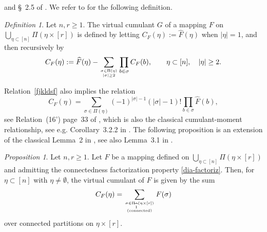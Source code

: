 \documentclass[bj,authoryear,noshowframe]{imsart}
\theoremstyle{plain}
\theoremstyle{remark}
\newtheorem{definition}[theorem]{Definition}
\newcommand{\E}{\mathbb{E}}
\newtheorem{prop}{Proposition}[section]
\begin{document}
 and \S~2.5 of \cite{peccatitaqqu}. 
 We refer to \cite[p.~33]{MalyshevMinlos91} for the following definition.
\begin{definition}
  Let $n,r\geq 1$.
  The virtual cumulant $G$ of 
 a mapping $F$ on $\bigcup_{\eta \subset [n]} \Pi ( \eta \times [r])$ 
 is defined by letting  
 $C_F ( \eta ):=\widehat{F}( \eta )$ when $| \eta |=1$, and
 then recursively by 
\begin{equation}
  \label{fjkldsf}
  C_F ( \eta ):=\widehat{F}( \eta )-\sum_{
    { \sigma \in \Pi (\eta )
    \atop 
    |\sigma|\geq 2
    }
  }
  \prod_{b \in \sigma } C_F ( b ), \qquad
  \eta \subset [n], \quad |\eta |\geq 2. 
\end{equation}
\end{definition} 
Relation~\eqref{fjkldsf} also implies the relation 
 \begin{equation}
   \label{jlkdf3} 
 C_F ( \eta )=
 \sum_{
   \sigma \in \Pi ( \eta )
 }
 (-1)^{|\sigma |-1} (|\sigma |-1)! \prod_{b\in \sigma} \widehat{F} ( b ), 
\end{equation}
 see Relation~(16') page~33 of \cite{MalyshevMinlos91},
 which is also the classical cumulant-moment relationship,
 see e.g. Corollary~3.2.2 in \cite{peccatitaqqu}. 
\noindent  
The following proposition is an extension of
the classical Lemma~2 in \cite[p.~34]{MalyshevMinlos91},
see also Lemma~3.1 in \cite{khorunzhiy}.
\begin{prop}
\label{mainthm-1}
Let $n,r\geq 1$. 
Let $F$ be a mapping defined on $\bigcup_{\eta \subset [n]}
 \Pi ( \eta \times [r])$ and admitting the {connectedness factorization} property
 \eqref{dia-factoriz}.
 Then, for $\eta \subset [n]$ with $\eta \ne\emptyset$, 
 the virtual cumulant of $F$ is given by the sum 
\begin{equation}
\label{keylma-2}
C_F (\eta ) = \sum_{\sigma \in \Pi_{\widehat{1}} ( \eta \times [r] )
  \atop {\rm (connected)}}
F(\sigma )
\end{equation}
over connected partitions on $\eta \times [r]$. 
\end{prop} 
\end{document}
